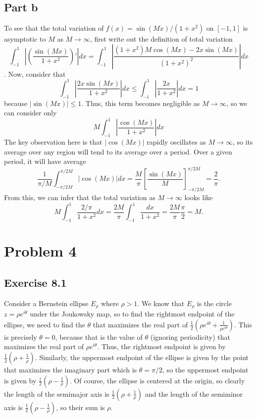 \documentclass{article}
\begin{document}
\subsection{Part b}
To see that the total variation of $f(x) =\sin(Mx)/(1 + x^2)$ on $[-1,1]$ is asymptotic to $M$ as $M\to\infty$, first write out the definition of total variation
\[
\int_{-1}^1\left|\left(\frac{\sin(Mx)}{1 + x^2}\right)'\right|dx=\int_{-1}^1\left|\frac{(1+x^2)M\cos(Mx)-2x\sin(Mx)}{(1 + x^2)^2}\right|dx
\].
Now, consider that
\[\int_{-1}^1\left|\frac{2x\sin(Mx)}{1+x^2}\right|dx\leq\int_{-1}^1\left|\frac{2x}{1+x^2}\right|dx=1
\]
because $|\sin(Mx)|\leq1$. Thus, this term becomes negligible as $M\to\infty$, so we can consider only
\[
M\int_{-1}^1\left|\frac{\cos(Mx)}{1 + x^2}\right|dx
\]
The key observation here is that $|\cos(Mx)|$ rapidly oscillates as $M\to\infty$, so its average over any region will tend to its average over a period. Over a given period, it will have average \[
\frac{1}{\pi/M}\int_{-\pi/2M}^{\pi/2M}|\cos(Mx)|dx=\frac{M}{\pi}\left[\frac{\sin(Mx)}{M}\right]_{-\pi/2M}^{\pi/2M}=\frac{2}{\pi}.
\]
From this, we can infer that the total variation as $M\to\infty$ looks like 
\[
M\int_{-1}^1\frac{2/\pi}{1 + x^2}dx=\frac{2M}{\pi}\int_{-1}^1\frac{dx}{1+x^2}=\frac{2M}{\pi}\frac{\pi}{2}=M.
\]

\section{Problem 4}
\subsection{Exercise 8.1}
Consider a Bernstein ellipse $E_\rho$ where $\rho>1$. We know that $E_\rho$ is the circle $z=\rho e^{i\theta}$ under the Joukowsky map, so to find the rightmost endpoint of the ellipse, we need to find the $\theta$ that maximizes the real part of $\frac{1}{2}(\rho e^{i\theta}+\frac{1}{\rho e^{i\theta}})$. This is precisely $\theta=0$, because that is the value of $\theta$ (ignoring periodicity) that maximizes the real part of $\rho e^{i\theta}$. Thus, the rightmost endpoint is given by $\frac{1}{2}(\rho+\frac{1}{\rho})$. Similarly, the uppermost endpoint of the ellipse is given by the point that maximizes the imaginary part which is $\theta=\pi/2$, so the uppermost endpoint is given by $\frac{i}{2}(\rho-\frac{1}{\rho})$. Of course, the ellipse is centered at the origin, so clearly the length of the semimajor axis is $\frac{1}{2}(\rho+\frac{1}{\rho})$ and the length of the semiminor axis is $\frac{1}{2}(\rho-\frac{1}{\rho})$, so their sum is $\rho$.
\end{document}
